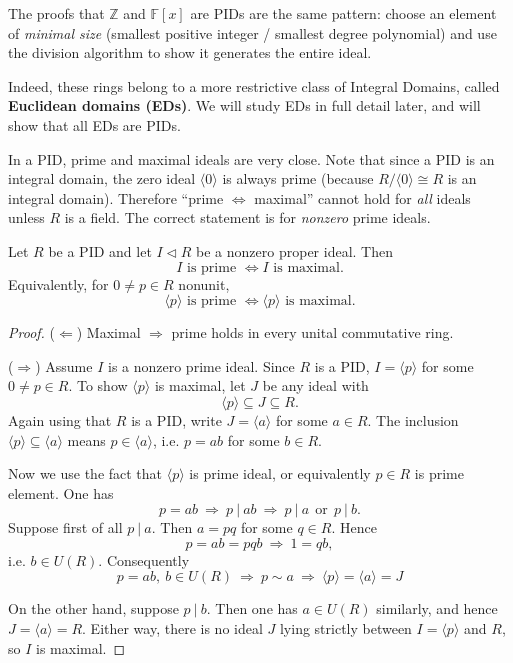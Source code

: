 \begin{remark}
The proofs that $\mathbb{Z}$ and $\mathbb{F}[x]$ are PIDs are the same pattern:
choose an element of \emph{minimal size} (smallest positive integer / smallest degree polynomial) and use the division algorithm to show it generates the entire ideal.

Indeed, these rings belong to a more restrictive class of Integral Domains, called {\bf Euclidean domains (EDs)}. We will study EDs in full detail later, and will show that all EDs are PIDs.
\end{remark}

In a PID, prime and maximal ideals are very close.  Note that since a PID is an integral domain, the zero ideal $\langle 0\rangle$
is always prime (because $R/\langle 0\rangle \cong R$ is an integral domain).  Therefore ``prime $\Leftrightarrow$ maximal'' cannot hold for
\emph{all} ideals unless $R$ is a field.  The correct statement is for \emph{nonzero} prime ideals.

\begin{proposition}
Let $R$ be a PID and let $I\triangleleft R$ be a nonzero proper ideal. Then
\[
I \text{ is prime } \Longleftrightarrow I \text{ is maximal}.
\]
Equivalently, for $0\neq p\in R$ nonunit,
\[
\langle p\rangle \text{ is prime } \Longleftrightarrow \langle p\rangle \text{ is maximal}.
\]
\end{proposition}

\begin{proof}
($\Leftarrow$) Maximal $\Rightarrow$ prime holds in every unital commutative ring.

\medskip
($\Rightarrow$) Assume $I$ is a nonzero prime ideal. Since $R$ is a PID, $I=\langle p\rangle$ for some $0\neq p\in R$.
To show $\langle p\rangle$ is maximal, let $J$ be any ideal with
\[
\langle p\rangle \subseteq J \subseteq R.
\]
Again using that $R$ is a PID, write $J=\langle a\rangle$ for some $a\in R$.
The inclusion $\langle p\rangle \subseteq \langle a\rangle$ means $p\in \langle a\rangle$, i.e. $p=ab$ for some $b\in R$.

Now we use the fact that $\langle p \rangle$ is prime ideal, or equivalently $p \in R$ is prime element. One has
$$p = ab\ \Rightarrow\ p \ | \ ab \ \Rightarrow\  p \ |\ a\ \ \mathrm{or}\ \ p \ |\ b.$$
Suppose first of all $p\ |\ a$. Then $a = pq$ for some $q \in R$. Hence
$$p = ab = pqb \ \Rightarrow\ 1 = qb,$$
i.e. $b \in U(R)$. Consequently
$$p = ab,\ b \in U(R) \ \Rightarrow\ p \sim a \ \Rightarrow \ \langle p \rangle = \langle a \rangle = J$$

On the other hand, suppose $p\ |\ b$. Then one has $a \in U(R)$ similarly, and hence $J = \langle a \rangle = R$. Either way, there is no ideal $J$ lying strictly between $I = \langle p \rangle$ and $R$, so $I$ is maximal.
\end{proof}


